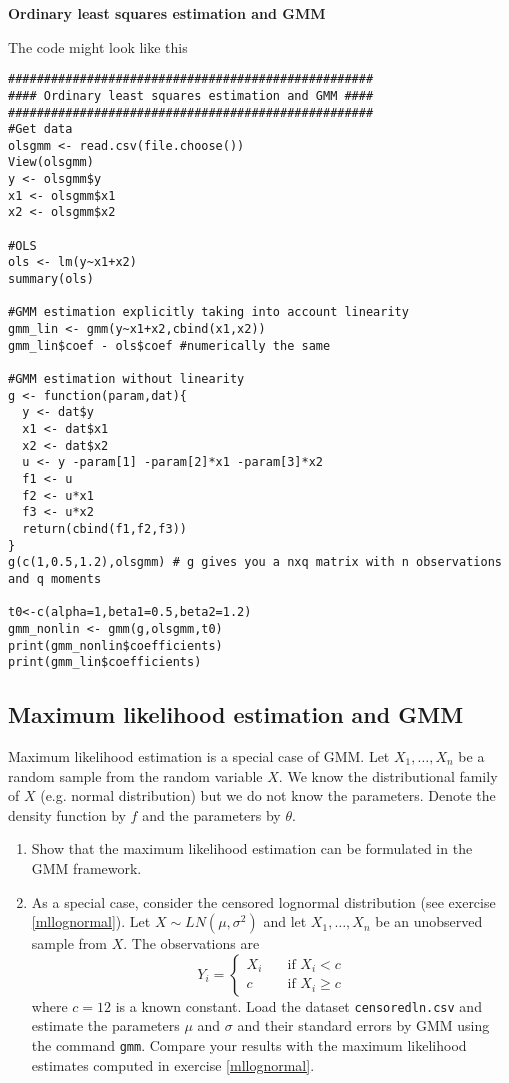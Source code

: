 \documentclass{article}
\begin{document}
\begin{solution}
\textbf{Ordinary least squares estimation and GMM}

The code might look like this
\begin{verbatim}
###################################################
#### Ordinary least squares estimation and GMM ####
###################################################
#Get data
olsgmm <- read.csv(file.choose())
View(olsgmm)
y <- olsgmm$y
x1 <- olsgmm$x1
x2 <- olsgmm$x2

#OLS
ols <- lm(y~x1+x2)
summary(ols)

#GMM estimation explicitly taking into account linearity
gmm_lin <- gmm(y~x1+x2,cbind(x1,x2))
gmm_lin$coef - ols$coef #numerically the same

#GMM estimation without linearity
g <- function(param,dat){
  y <- dat$y
  x1 <- dat$x1
  x2 <- dat$x2
  u <- y -param[1] -param[2]*x1 -param[3]*x2
  f1 <- u
  f2 <- u*x1
  f3 <- u*x2
  return(cbind(f1,f2,f3))
}
g(c(1,0.5,1.2),olsgmm) # g gives you a nxq matrix with n observations and q moments

t0<-c(alpha=1,beta1=0.5,beta2=1.2)
gmm_nonlin <- gmm(g,olsgmm,t0)
print(gmm_nonlin$coefficients)
print(gmm_lin$coefficients)
\end{verbatim}
\end{solution}

\subsection{Maximum likelihood estimation and GMM}

Maximum likelihood estimation is a special case of GMM. Let $X_{1},\ldots
,X_{n}$ be a random sample from the random variable $X$. We know the
distributional family of $X$ (e.g. normal distribution) but we do not know
the parameters. Denote the density function by $f$ and the parameters by $%
\theta $.

\begin{enumerate}
\item Show that the maximum likelihood estimation can be formulated in the
GMM framework.

\item As a special case, consider the censored lognormal distribution (see
exercise \ref{mllognormal}). Let $X\sim LN(\mu ,\sigma ^{2})$ and let $%
X_{1},\ldots ,X_{n}$ be an unobserved sample from $X$. The observations are%
\begin{equation*}
Y_{i}=\left\{
\begin{array}{ll}
X_{i} & \quad \text{if }X_{i}<c \\
c & \quad \text{if }X_{i}\geq c%
\end{array}%
\right.
\end{equation*}%
where $c=12$ is a known constant. Load the dataset \texttt{censoredln.csv}
and estimate the parameters $\mu $ and $\sigma $ and their standard errors
by GMM using the command \texttt{gmm}. Compare your results with the maximum
likelihood estimates computed in exercise \ref{mllognormal}.
\end{enumerate}
\end{document}
